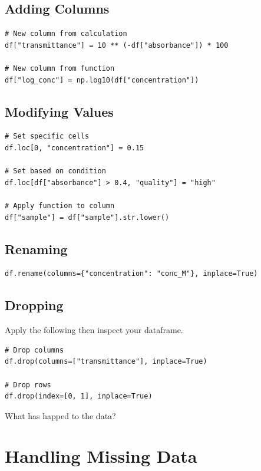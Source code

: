 \subsection{Adding Columns}

\begin{lstlisting}
# New column from calculation
df["transmittance"] = 10 ** (-df["absorbance"]) * 100

# New column from function
df["log_conc"] = np.log10(df["concentration"])
\end{lstlisting}

\subsection{Modifying Values}

\begin{lstlisting}
# Set specific cells
df.loc[0, "concentration"] = 0.15

# Set based on condition
df.loc[df["absorbance"] > 0.4, "quality"] = "high"

# Apply function to column
df["sample"] = df["sample"].str.lower()
\end{lstlisting}

\subsection{Renaming}

\begin{lstlisting}
df.rename(columns={"concentration": "conc_M"}, inplace=True)
\end{lstlisting}

\subsection{Dropping}

Apply the following then inspect your dataframe.

\begin{lstlisting}
# Drop columns
df.drop(columns=["transmittance"], inplace=True)

# Drop rows
df.drop(index=[0, 1], inplace=True)
\end{lstlisting}

What has happed to the data?

\section{Handling Missing Data}
\label{sec:missing}

